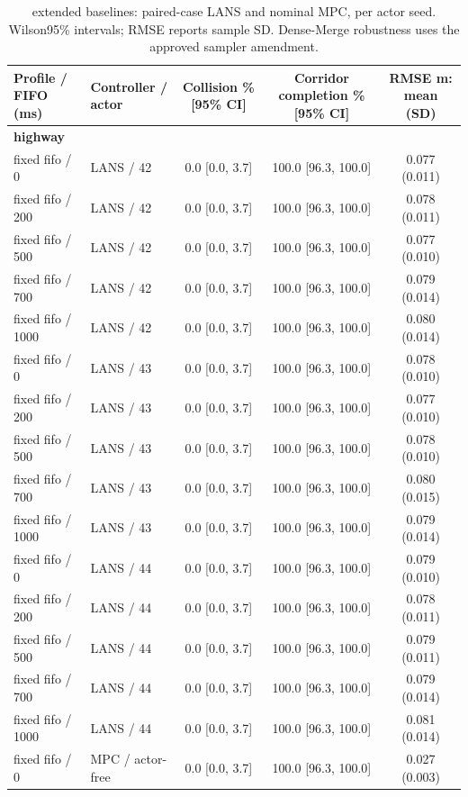 \begin{longtable}{llccc}
\caption{extended baselines: paired-case LANS and nominal MPC, per actor seed. Wilson95\% intervals; RMSE reports sample SD. Dense-Merge robustness uses the approved sampler amendment.}\\
\toprule
Profile / FIFO (ms) & Controller / actor & Collision \% [95\% CI] & Corridor completion \% [95\% CI] & RMSE m: mean (SD) \\
\midrule
\multicolumn{5}{l}{\textbf{highway}} \\
fixed fifo / 0 & LANS / 42 & 0.0 [0.0, 3.7] & 100.0 [96.3, 100.0] & 0.077 (0.011) \\
fixed fifo / 200 & LANS / 42 & 0.0 [0.0, 3.7] & 100.0 [96.3, 100.0] & 0.078 (0.011) \\
fixed fifo / 500 & LANS / 42 & 0.0 [0.0, 3.7] & 100.0 [96.3, 100.0] & 0.077 (0.010) \\
fixed fifo / 700 & LANS / 42 & 0.0 [0.0, 3.7] & 100.0 [96.3, 100.0] & 0.079 (0.014) \\
fixed fifo / 1000 & LANS / 42 & 0.0 [0.0, 3.7] & 100.0 [96.3, 100.0] & 0.080 (0.014) \\
fixed fifo / 0 & LANS / 43 & 0.0 [0.0, 3.7] & 100.0 [96.3, 100.0] & 0.078 (0.010) \\
fixed fifo / 200 & LANS / 43 & 0.0 [0.0, 3.7] & 100.0 [96.3, 100.0] & 0.077 (0.010) \\
fixed fifo / 500 & LANS / 43 & 0.0 [0.0, 3.7] & 100.0 [96.3, 100.0] & 0.078 (0.010) \\
fixed fifo / 700 & LANS / 43 & 0.0 [0.0, 3.7] & 100.0 [96.3, 100.0] & 0.080 (0.015) \\
fixed fifo / 1000 & LANS / 43 & 0.0 [0.0, 3.7] & 100.0 [96.3, 100.0] & 0.079 (0.014) \\
fixed fifo / 0 & LANS / 44 & 0.0 [0.0, 3.7] & 100.0 [96.3, 100.0] & 0.079 (0.010) \\
fixed fifo / 200 & LANS / 44 & 0.0 [0.0, 3.7] & 100.0 [96.3, 100.0] & 0.078 (0.011) \\
fixed fifo / 500 & LANS / 44 & 0.0 [0.0, 3.7] & 100.0 [96.3, 100.0] & 0.079 (0.011) \\
fixed fifo / 700 & LANS / 44 & 0.0 [0.0, 3.7] & 100.0 [96.3, 100.0] & 0.079 (0.014) \\
fixed fifo / 1000 & LANS / 44 & 0.0 [0.0, 3.7] & 100.0 [96.3, 100.0] & 0.081 (0.014) \\
fixed fifo / 0 & MPC / actor-free & 0.0 [0.0, 3.7] & 100.0 [96.3, 100.0] & 0.027 (0.003) \\

\end{longtable}
